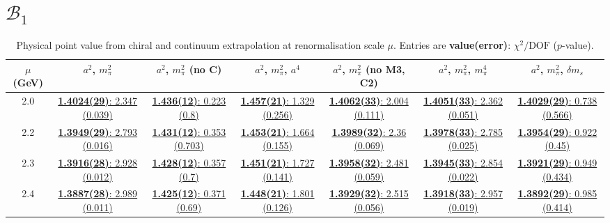 \documentclass[12pt]{extarticle}
\begin{document}
\clearpage
\section{$\mathcal{B}_1$}
\begin{table}[h!]
\begin{center}
\begin{tabular}{|c|c|c|c|c|c|c|}
\hline
$\mu$ (GeV) & $a^2$, $m_\pi^2$& $a^2$, $m_\pi^2$ (no C)& $a^2$, $m_\pi^2$, $a^4$& $a^2$, $m_\pi^2$ (no M3, C2)& $a^2$, $m_\pi^2$, $m_\pi^4$& $a^2$, $m_\pi^2$, $\delta m_s$\\
\hline
2.0& \hyperlink{VVpAA/SUSY/bag_a2m2_20.pdf.1}{\textbf{1.4024(29)}: 2.347 (0.039)} & \hyperlink{VVpAA/SUSY/bag_a2m2noC_20.pdf.1}{\textbf{1.436(12)}: 0.223 (0.8)} & \hyperlink{VVpAA/SUSY/bag_a2a4m2_20.pdf.1}{\textbf{1.457(21)}: 1.329 (0.256)} & \hyperlink{VVpAA/SUSY/bag_a2m2mcut_20.pdf.1}{\textbf{1.4062(33)}: 2.004 (0.111)} & \hyperlink{VVpAA/SUSY/bag_a2m2m4_20.pdf.1}{\textbf{1.4051(33)}: 2.362 (0.051)} & \hyperlink{VVpAA/SUSY/bag_a2m2delm_20.pdf.1}{\textbf{1.4029(29)}: 0.738 (0.566)}\\
2.2& \hyperlink{VVpAA/SUSY/bag_a2m2_22.pdf.1}{\textbf{1.3949(29)}: 2.793 (0.016)} & \hyperlink{VVpAA/SUSY/bag_a2m2noC_22.pdf.1}{\textbf{1.431(12)}: 0.353 (0.703)} & \hyperlink{VVpAA/SUSY/bag_a2a4m2_22.pdf.1}{\textbf{1.453(21)}: 1.664 (0.155)} & \hyperlink{VVpAA/SUSY/bag_a2m2mcut_22.pdf.1}{\textbf{1.3989(32)}: 2.36 (0.069)} & \hyperlink{VVpAA/SUSY/bag_a2m2m4_22.pdf.1}{\textbf{1.3978(33)}: 2.785 (0.025)} & \hyperlink{VVpAA/SUSY/bag_a2m2delm_22.pdf.1}{\textbf{1.3954(29)}: 0.922 (0.45)}\\
2.3& \hyperlink{VVpAA/SUSY/bag_a2m2_23.pdf.1}{\textbf{1.3916(28)}: 2.928 (0.012)} & \hyperlink{VVpAA/SUSY/bag_a2m2noC_23.pdf.1}{\textbf{1.428(12)}: 0.357 (0.7)} & \hyperlink{VVpAA/SUSY/bag_a2a4m2_23.pdf.1}{\textbf{1.451(21)}: 1.727 (0.141)} & \hyperlink{VVpAA/SUSY/bag_a2m2mcut_23.pdf.1}{\textbf{1.3958(32)}: 2.481 (0.059)} & \hyperlink{VVpAA/SUSY/bag_a2m2m4_23.pdf.1}{\textbf{1.3945(33)}: 2.854 (0.022)} & \hyperlink{VVpAA/SUSY/bag_a2m2delm_23.pdf.1}{\textbf{1.3921(29)}: 0.949 (0.434)}\\
2.4& \hyperlink{VVpAA/SUSY/bag_a2m2_24.pdf.1}{\textbf{1.3887(28)}: 2.989 (0.011)} & \hyperlink{VVpAA/SUSY/bag_a2m2noC_24.pdf.1}{\textbf{1.425(12)}: 0.371 (0.69)} & \hyperlink{VVpAA/SUSY/bag_a2a4m2_24.pdf.1}{\textbf{1.448(21)}: 1.801 (0.126)} & \hyperlink{VVpAA/SUSY/bag_a2m2mcut_24.pdf.1}{\textbf{1.3929(32)}: 2.515 (0.056)} & \hyperlink{VVpAA/SUSY/bag_a2m2m4_24.pdf.1}{\textbf{1.3918(33)}: 2.957 (0.019)} & \hyperlink{VVpAA/SUSY/bag_a2m2delm_24.pdf.1}{\textbf{1.3892(29)}: 0.985 (0.414)}\\
\hline
\end{tabular}
\caption{Physical point value from chiral and continuum extrapolation at renormalisation scale $\mu$. Entries are \textbf{value(error)}: $\chi^2/\text{DOF}$ ($p$-value).}
\end{center}
\end{table}
\end{document}
